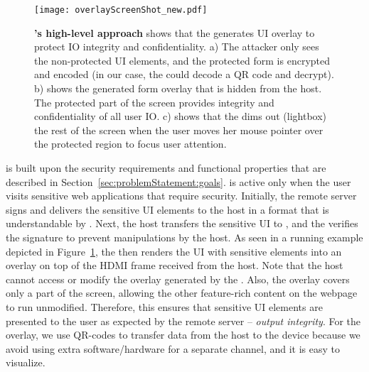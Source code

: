 \begin{figure}[t]
\centering
\texttt{[image: overlayScreenShot\_new.pdf]}
\caption{\textbf{\name's high-level approach} shows that the \device generates UI overlay to protect IO integrity and confidentiality. a) The attacker only sees the non-protected UI elements, and the protected form is encrypted and encoded (in our case, the \device could decode a QR code and decrypt). b) shows the \device generated form overlay that is hidden from the host. The protected part of the screen provides integrity and confidentiality of all user IO. c) shows that the \device dims out (lightbox) the rest of the screen when the user moves her mouse pointer over the protected region to focus user attention.}
\spacesave
\label{fig:screenshot_1}
\end{figure}

\name is built upon the security requirements and functional properties that are described in Section~\ref{sec:problemStatement:goals}. %
\device is active only when the user visits sensitive web applications that require \name security.
Initially, the remote server signs and delivers the sensitive UI elements to the host in a format that is understandable by \device. Next, the host transfers the sensitive UI to \device, and the \device verifies the signature to prevent manipulations by the host. As seen in a running example depicted in Figure~\ref{fig:screenshot_1}, the \device then renders the UI with sensitive elements into an overlay on top of the HDMI frame received from the host. Note that the host cannot access or modify the overlay generated by the \device. Also, the overlay covers only a part of the screen, allowing the other feature-rich content on the webpage to run unmodified. Therefore, this ensures that sensitive UI elements are presented to the user as expected by the remote server -- \emph{output integrity}. For the overlay, we use QR-codes to transfer data from the host to the device because we avoid using extra software/hardware for a separate channel, and it is easy to visualize.

